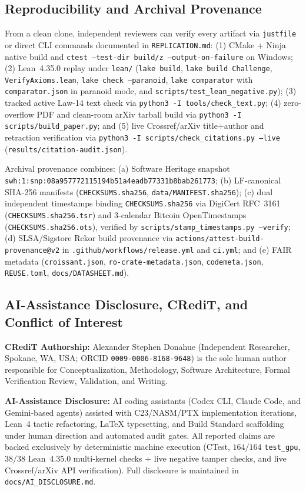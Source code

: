 \documentclass[11pt,reqno]{amsart}
\newcommand{\code}[1]{\texttt{\footnotesize #1}}
\newcommand{\us}{\_\allowbreak}
\newcommand{\slsh}{/\allowbreak}
\begin{document}
\subsection{Reproducibility and Archival Provenance}
From a clean clone, independent reviewers can verify every artifact via \code{justfile} or direct CLI commands documented in \code{REPLICATION.md}: (1) CMake + Ninja native build and \code{ctest --test-dir build/z --output-on-failure} on Windows; (2) Lean~4.35.0 replay under \code{lean/} (\code{lake build}, \code{lake build Challenge}, \code{VerifyAxioms.lean}, \code{lake check --paranoid}, \code{lake comparator} with \code{comparator.json} in paranoid mode, and \code{scripts\slsh test\us lean\us negative.py}); (3) tracked active Law-14 text check via \code{python3 -I tools\slsh check\us text.py}; (4) zero-overflow PDF and clean-room arXiv tarball build via \code{python3 -I scripts\slsh build\us paper.py}; and (5) live Crossref/arXiv title+author and retraction verification via \code{python3 -I scripts\slsh check\us citations.py --live} (\code{results\slsh citation-audit.json}).

Archival provenance combines: (a) Software Heritage snapshot \code{swh:1:snp:\allowbreak 08a957772115\allowbreak 194b51a4eadb\allowbreak 77331b8bab261773}; (b) LF-canonical SHA-256 manifests (\code{CHECKSUMS.sha256}, \code{data\slsh MANIFEST.sha256}); (c) dual independent timestamps binding \code{CHECKSUMS.sha256} via DigiCert RFC~3161 (\code{CHECKSUMS.sha256.tsr}) and 3-calendar Bitcoin OpenTimestamps (\code{CHECKSUMS.sha256.ots}), verified by \code{scripts\slsh stamp\us timestamps.py --verify}; (d) SLSA/Sigstore Rekor build provenance via \code{actions\slsh attest-build-provenance@v2} in \code{.github\slsh workflows\slsh release.yml} and \code{ci.yml}; and (e) FAIR metadata (\code{croissant.json}, \code{ro-crate-metadata.json}, \code{codemeta.json}, \code{REUSE.toml}, \code{docs\slsh DATASHEET.md}).

\subsection{AI-Assistance Disclosure, CRediT, and Conflict of Interest}
\textbf{CRediT Authorship:} Alexander Stephen Donahue (Independent Researcher, Spokane, WA, USA; ORCID \code{0009-0006-8168-9648}) is the sole human author responsible for Conceptualization, Methodology, Software Architecture, Formal Verification Review, Validation, and Writing.

\textbf{AI-Assistance Disclosure:} AI coding assistants (Codex CLI, Claude Code, and Gemini-based agents) assisted with C23/NASM/PTX implementation iterations, Lean~4 tactic refactoring, LaTeX typesetting, and Build Standard scaffolding under human direction and automated audit gates. All reported claims are backed exclusively by deterministic machine execution (CTest, $164/164$ \code{test\us gpu}, $38/38$ Lean~4.35.0 multi-kernel checks + live negative tamper checks, and live Crossref/arXiv API verification). Full disclosure is maintained in \code{docs\slsh AI\us DISCLOSURE.md}.
\end{document}
